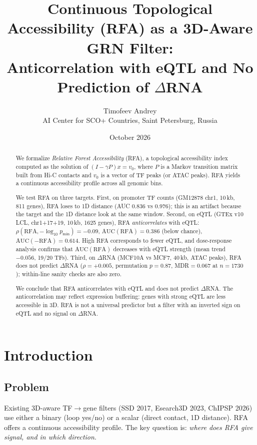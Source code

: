 \documentclass[11pt,a4paper]{article}
\title{Continuous Topological Accessibility (RFA) as a 3D-Aware GRN Filter: \\
Anticorrelation with eQTL and No Prediction of $\Delta$RNA}
\author{Timofeev Andrey \\
\small AI Center for SCO+ Countries, Saint Petersburg, Russia}
\date{October 2026}
\begin{document}
\maketitle

\begin{abstract}
We formalize \emph{Relative Forest Accessibility} (RFA), a topological accessibility index computed as the solution of $(I - \gamma P)x = v_0$, where $P$ is a Markov transition matrix built from Hi-C contacts and $v_0$ is a vector of TF peaks (or ATAC peaks). RFA yields a continuous accessibility profile across all genomic bins.

We test RFA on three targets. First, on promoter TF counts (GM12878 chr1, 10\,kb, 811 genes), RFA loses to 1D distance (AUC 0.836 vs 0.976); this is an artifact because the target and the 1D distance look at the same window. Second, on eQTL (GTEx v10 LCL, chr1+17+19, 10\,kb, 1625 genes), RFA \emph{anticorrelates} with eQTL: $\rho(\mathrm{RFA}, -\log_{10} p_{\min}) = -0.09$, $\mathrm{AUC}(\mathrm{RFA}) = 0.386$ (below chance), $\mathrm{AUC}(-\mathrm{RFA}) = 0.614$. High RFA corresponds to fewer eQTL, and dose-response analysis confirms that $\mathrm{AUC}(\mathrm{RFA})$ decreases with eQTL strength (mean trend $-0.056$, 19/20 TFs). Third, on $\Delta$RNA (MCF10A vs MCF7, 40\,kb, ATAC peaks), RFA does not predict $\Delta$RNA ($\rho = +0.005$, permutation $p=0.87$, MDR$=0.067$ at $n=1730$); within-line sanity checks are also zero.

We conclude that RFA anticorrelates with eQTL and does not predict $\Delta$RNA. The anticorrelation may reflect expression buffering: genes with strong eQTL are less accessible in 3D. RFA is not a universal predictor but a filter with an inverted sign on eQTL and no signal on $\Delta$RNA.
\end{abstract}

\section{Introduction}

\subsection{Problem}
Existing 3D-aware TF$\rightarrow$gene filters (SSD 2017, Esearch3D 2023, ChIPSP 2026) use either a binary (loop yes/no) or a scalar (direct contact, 1D distance). RFA offers a continuous accessibility profile. The key question is: \emph{where does RFA give signal, and in which direction}.
\end{document}

